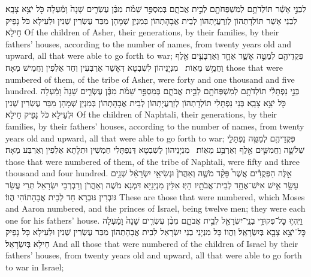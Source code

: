 {לִבְנֵ֣י אָשֵׁ֔ר תּוֹלְדֹתָ֥ם לְמִשְׁפְּחֹתָ֖ם לְבֵ֣ית אֲבֹתָ֑ם בְּמִסְפַּ֣ר שֵׁמֹ֗ת מִבֶּ֨ן עֶשְׂרִ֤ים שָׁנָה֙ וָמַ֔עְלָה כֹּ֖ל יֹצֵ֥א צָבָֽא׃}
{לִבְנֵי אָשֵׁר תּוֹלְדָתְהוֹן לְזַרְעֲיָתְהוֹן לְבֵית אֲבָהָתְהוֹן בְּמִנְיַן שְׁמָהָן מִבַּר עֶשְׂרִין שְׁנִין וּלְעֵילָא כֹּל נָפֵיק חֵילָא׃}
{Of the children of Asher, their generations, by their families, by their fathers’ houses, according to the number of names, from twenty years old and upward, all that were able to go forth to war;}{}
{פְּקֻדֵיהֶ֖ם לְמַטֵּ֣ה אָשֵׁ֑ר אֶחָ֧ד וְאַרְבָּעִ֛ים אֶ֖לֶף וַחֲמֵ֥שׁ מֵאֽוֹת׃ \petucha }
{מִנְיָנֵיהוֹן לְשִׁבְטָא דְּאָשֵׁר אַרְבְּעִין וְחַד אַלְפִין וַחֲמֵישׁ מְאָה׃}
{those that were numbered of them, of the tribe of Asher, were forty and one thousand and five hundred.}{}
{בְּנֵ֣י נַפְתָּלִ֔י תּוֹלְדֹתָ֥ם לְמִשְׁפְּחֹתָ֖ם לְבֵ֣ית אֲבֹתָ֑ם בְּמִסְפַּ֣ר שֵׁמֹ֗ת מִבֶּ֨ן עֶשְׂרִ֤ים שָׁנָה֙ וָמַ֔עְלָה כֹּ֖ל יֹצֵ֥א צָבָֽא׃}
{בְּנֵי נַפְתָּלִי תּוֹלְדָתְהוֹן לְזַרְעֲיָתְהוֹן לְבֵית אֲבָהָתְהוֹן בְּמִנְיַן שְׁמָהָן מִבַּר עֶשְׂרִין שְׁנִין וּלְעֵילָא כֹּל נָפֵיק חֵילָא׃}
{Of the children of Naphtali, their generations, by their families, by their fathers’ houses, according to the number of names, from twenty years old and upward, all that were able to go forth to war;}{}
{פְּקֻדֵיהֶ֖ם לְמַטֵּ֣ה נַפְתָּלִ֑י שְׁלֹשָׁ֧ה וַחֲמִשִּׁ֛ים אֶ֖לֶף וְאַרְבַּ֥ע מֵאֽוֹת׃ \petucha }
{מִנְיָנֵיהוֹן לְשִׁבְטָא דְּנַפְתָּלִי חַמְשִׁין וּתְלָתָא אַלְפִין וְאַרְבַּע מְאָה׃}
{those that were numbered of them, of the tribe of Naphtali, were fifty and three thousand and four hundred.}{}
{אֵ֣לֶּה הַפְּקֻדִ֡ים אֲשֶׁר֩ פָּקַ֨ד מֹשֶׁ֤ה וְאַהֲרֹן֙ וּנְשִׂיאֵ֣י יִשְׂרָאֵ֔ל שְׁנֵ֥ים עָשָׂ֖ר אִ֑ישׁ אִישׁ־אֶחָ֥ד לְבֵית־אֲבֹתָ֖יו הָיֽוּ׃}
{אִלֵּין מִנְיָנַיָּא דִּמְנָא מֹשֶׁה וְאַהֲרֹן וְרַבְרְבֵי יִשְׂרָאֵל תְּרֵי עֲשַׂר גּוּבְרִין גּוּבְרָא חַד לְבֵית אֲבָהָתוֹהִי הֲווֹ׃}
{These are those that were numbered, which Moses and Aaron numbered, and the princes of Israel, being twelve men; they were each one for his fathers’ house.}{}
{וַיִּֽהְי֛וּ כׇּל־פְּקוּדֵ֥י בְנֵֽי־יִשְׂרָאֵ֖ל לְבֵ֣ית אֲבֹתָ֑ם מִבֶּ֨ן עֶשְׂרִ֤ים שָׁנָה֙ וָמַ֔עְלָה כׇּל־יֹצֵ֥א צָבָ֖א בְּיִשְׂרָאֵֽל׃}
{וַהֲווֹ כָּל מִנְיָנֵי בְנֵי יִשְׂרָאֵל לְבֵית אֲבָהָתְהוֹן מִבַּר עֶשְׂרִין שְׁנִין וּלְעֵילָא כָּל נָפֵיק חֵילָא בְּיִשְׂרָאֵל׃}
{And all those that were numbered of the children of Israel by their fathers’ houses, from twenty years old and upward, all that were able to go forth to war in Israel;}{}
